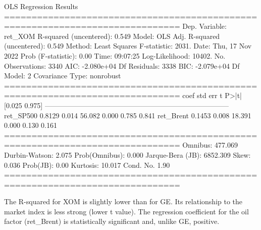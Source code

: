 \begin{ioutput}
OLS Regression Results                                
==============================================================================
Dep. Variable:                ret_XOM   R-squared (uncentered):          0.549
Model:                            OLS   Adj. R-squared (uncentered):     0.549
Method:                 Least Squares   F-statistic:                     2031.
Date:                Thu, 17 Nov 2022   Prob (F-statistic):               0.00
Time:                        09:07:25   Log-Likelihood:                 10402.
No. Observations:                3340   AIC:                        -2.080e+04
Df Residuals:                    3338   BIC:                        -2.079e+04
Df Model:                           2                                                  
Covariance Type:            nonrobust                                                  
==============================================================================
coef          std err          t      P>|t|      [0.025      0.975]
------------------------------------------------------------------------------
ret_SP500      0.8129      0.014     56.082      0.000       0.785       0.841
ret_Brent      0.1453      0.008     18.391      0.000       0.130       0.161
==============================================================================
Omnibus:                      477.069   Durbin-Watson:                   2.075
Prob(Omnibus):                  0.000   Jarque-Bera (JB):             6852.309
Skew:                           0.036   Prob(JB):                         0.00
Kurtosis:                      10.017   Cond. No.                         1.90
==============================================================================
\end{ioutput}

The R-squared for XOM is slightly lower than for GE. Its relationship to the market index is less strong (lower t value).
The regression coefficient for the oil factor (ret\_Brent) is statistically significant and, unlike GE, positive.

